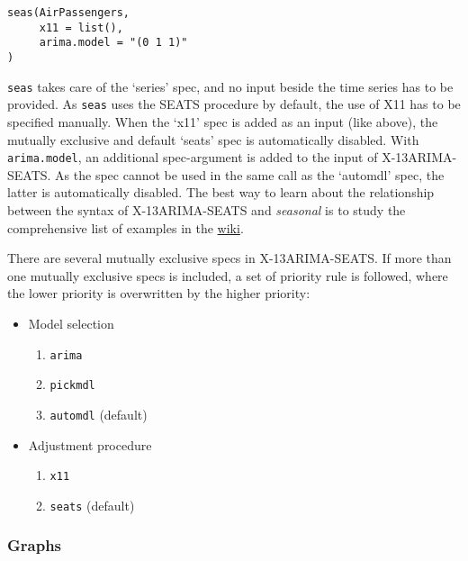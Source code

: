 \begin{verbatim}
seas(AirPassengers,
     x11 = list(),
     arima.model = "(0 1 1)"
)
\end{verbatim}

\texttt{seas} takes care of the `series' spec, and no input beside the
time series has to be provided. As \texttt{seas} uses the SEATS
procedure by default, the use of X11 has to be specified manually. When
the `x11' spec is added as an input (like above), the mutually exclusive
and default `seats' spec is automatically disabled. With
\texttt{arima.model}, an additional spec-argument is added to the input
of X-13ARIMA-SEATS. As the spec cannot be used in the same call as the
`automdl' spec, the latter is automatically disabled. The best way to
learn about the relationship between the syntax of X-13ARIMA-SEATS and
\emph{seasonal} is to study the comprehensive list of examples in the
\href{https://github.com/christophsax/seasonal/wiki/Examples-of-X-13ARIMA-SEATS-in-R}{wiki}.

There are several mutually exclusive specs in X-13ARIMA-SEATS. If more
than one mutually exclusive specs is included, a set of priority rule is
followed, where the lower priority is overwritten by the higher
priority:

\begin{itemize}
\itemsep1pt\parskip0pt
\item
  Model selection

  \begin{enumerate}
  \def\labelenumi{\arabic{enumi}.}
  \itemsep1pt\parskip0pt
  \item
    \texttt{arima}
  \item
    \texttt{pickmdl}
  \item
    \texttt{automdl} (default)
  \end{enumerate}
\item
  Adjustment procedure

  \begin{enumerate}
  \def\labelenumi{\arabic{enumi}.}
  \itemsep1pt\parskip0pt
  \item
    \texttt{x11}
  \item
    \texttt{seats} (default)
  \end{enumerate}
\end{itemize}

\subsubsection{Graphs}\label{graphs}

